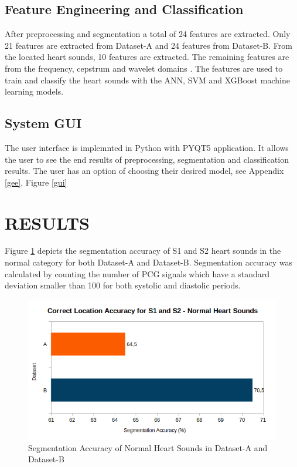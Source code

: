 \documentclass[10pt,twocolumn]{witseiepaper}
\begin{document}
\subsection{Feature Engineering and Classification}
After preprocessing and segmentation a total of 24 features are extracted. Only 21 features
are extracted from Dataset-A and 24 features from Dataset-B. From the located heart sounds, 10 features 
are extracted. The remaining features are from the frequency, cepstrum and wavelet domains \cite{elias}. The features are used to train and classify the heart sounds with the ANN, SVM and XGBoost machine learning
models.

\subsection{System GUI}
The user interface is implemnted in Python with PYQT5 application. It allows the user to see the end results of preprocessing, segmentation and classification results. The user has an option of choosing their desired model, see Appendix \ref{gee}, Figure \ref{gui}

\section{RESULTS}

Figure \ref{seg} depicts the segmentation accuracy of S1 and S2 heart sounds in the normal category for both Dataset-A and Dataset-B. Segmentation accuracy was calculated by counting the number of PCG signals which have a standard deviation smaller than 100 for both systolic and diastolic periods.
\begin{figure}[h!]
    \centering
    \includegraphics[scale=0.5]{elias.png}
    \caption{Segmentation Accuracy of Normal Heart Sounds in Dataset-A and Dataset-B}
    \label{seg}
\end{figure}{}
\end{document}
